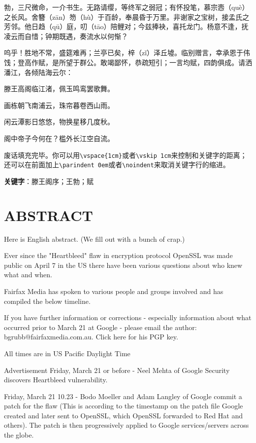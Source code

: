 勃，三尺微命，一介书生。无路请缨，等终军之弱冠；有怀投笔，慕宗悫（què）之长风。舍簪（zān）笏（hù）于百龄，奉晨昏于万里。非谢家之宝树，接孟氏之芳邻。他日趋（qū）庭，叨（tāo）陪鲤对；今兹捧袂，喜托龙门。杨意不逢，抚凌云而自惜；钟期既遇，奏流水以何惭？

呜乎！胜地不常，盛筵难再；兰亭已矣，梓（zǐ）泽丘墟。临别赠言，幸承恩于伟饯；登高作赋，是所望于群公。敢竭鄙怀，恭疏短引；一言均赋，四韵俱成。请洒潘江，各倾陆海云尔：

\begin{center}
滕王高阁临江渚，佩玉鸣鸾罢歌舞。

画栋朝飞南浦云，珠帘暮卷西山雨。

闲云潭影日悠悠，物换星移几度秋。

阁中帝子今何在？槛外长江空自流。
\end{center}

废话填充完毕。你可以用\verb|\vspace{1cm}|或者\verb|\vskip 1cm|来控制和关键字的距离；还可以在前面加上\verb|\parindent 0em|或者\verb|\noindent|来取消关键字行的缩进。

\vspace{1cm}
\textbf{关键字}：滕王阁序；王勃；赋


\chapter{ABSTRACT}
Here is English abstract. (We fill out with a bunch of crap.)

Ever since the "Heartbleed" flaw in encryption protocol OpenSSL was made public on April 7 in the US there have been various questions about who knew what and when.

Fairfax Media has spoken to various people and groups involved and has compiled the below timeline.

If you have further information or corrections - especially information about what occurred prior to March 21 at Google - please email the author: bgrubb@fairfaxmedia.com.au. Click here for his PGP key.

All times are in US Pacific Daylight Time

Advertisement
Friday, March 21 or before - Neel Mehta of Google Security discovers Heartbleed vulnerability.

Friday, March 21 10.23 -  Bodo Moeller and Adam Langley of Google commit a patch for the flaw (This is according to the timestamp on the patch file Google created and later sent to OpenSSL, which OpenSSL forwarded to Red Hat and others). The patch is then progressively applied to Google services/servers across the globe.

